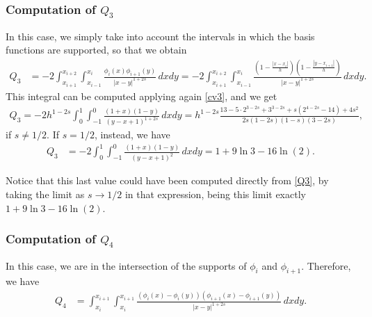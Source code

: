 \subsubsection*{Computation of $Q_3$}
In this case, we simply take into account the intervals in which the basis functions are supported, so that we obtain
\begin{align*}
	Q_3 &= -2\int_{x_{i+1}}^{x_{i+2}}\int_{x_{i-1}}^{x_i} \frac{\phi_i(x)\phi_{i+1}(y)}{|x-y|^{1+2s}}\,dxdy = - 2\int_{x_{i+1}}^{x_{i+2}}\int_{x_{i-1}}^{x_i} \frac{\left(1-\frac{|x-x_i|}{h}\right)\left(1-\frac{|y-x_{i+1}|}{h}\right)}{|x-y|^{1+2s}}\,dxdy.
\end{align*}
This integral can be computed applying again \eqref{cv3}, and we get
\begin{align}\label{Q3}
	Q_3 = -2h^{1-2s}\int_0^1\int_{-1}^0 \frac{(1+x)(1-y)}{(y-x+1)^{1+2s}}\,dxdy = h^{1-2s}\frac{13-5\cdot 2^{3-2s}+3^{3-2s}+s(2^{4-2s}-14)+4s^2}{2s(1-2s)(1-s)(3-2s)},
\end{align}
if $s\neq 1/2$. If $s=1/2$, instead, we have 
\begin{align*}
	Q_3 &= -2\int_0^1\int_{-1}^0 \frac{(1+x)(1-y)}{(y-x+1)^2}\,dxdy = 1+9\ln 3-16\ln(2).
\end{align*}

Notice that this last value could have been computed directly from \eqref{Q3}, by taking the limit as $s\to 1/2$ in that expression, being this limit exactly $1+9\ln 3-16\ln(2)$.

\subsubsection*{Computation of $Q_4$}
In this case, we are in the intersection of the supports of $\phi_i$ and $\phi_{i+1}$. Therefore, we have
\begin{align*}
	Q_4 &= \int_{x_i}^{x_{i+1}}\int_{x_i}^{x_{i+1}} \frac{(\phi_i(x)-\phi_i(y))(\phi_{i+1}(x)-\phi_{i+1}(y))}{|x-y|^{1+2s}}\,dxdy. 
\end{align*}

